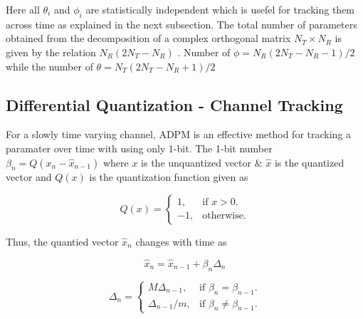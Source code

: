 \documentclass[conference]{IEEEtran}
\begin{document}
Here all $\theta_i$ and $\phi_i$ are statistically independent which is usefel for tracking them across time as explained in the next subsection. The total number of parameters obtained from the decomposition of a complex orthogonal matrix $N_{T} \times N_{R} $ is given by the relation $N_{R}(2N_{T} - N_{R}) $ \cite{4114278}. Number of $\phi = N_{R}(2N_{T} - N_{R}-1)/2$ while the number of $\theta = N_{T}(2N_{T} - N_{R}+1)/2$ 



  

\subsection{Differential Quantization - Channel Tracking} 
\label{quantiz} 

For a slowly time varying channel, ADPM is an effective method for tracking a paramater over time with using only 1-bit. The 1-bit number $\beta_{n} = Q(x_{n} - \hat{x}_{n-1})$ where $x$ is the unquantized vector $\&$ $\hat{x}$ is the quantized vector and $Q(x)$ is the quantization function given as 

  

\begin{equation}
  Q(x)=\begin{cases}
    1, & \text{if $x>0$}.\\
    -1, & \text{otherwise}.
  \end{cases}
\end{equation}

Thus, the quantied vector $\hat{x}_n$ changes with time as 

\begin{equation} 
\hat{x}_{n} = \hat{x}_{n-1} + \beta_{n}\Delta_{n} 
\end{equation} 

\begin{equation} 
\Delta_{n} = \begin{cases} 
    M \Delta_{n-1}, & \text{if $\beta_{n} = \beta_{n-1}$}.\\ 
    \Delta_{n-1}/m , & \text{if $\beta_{n} \neq \beta_{n-1}$}. 
  \end{cases} 
\end{equation} 
\end{document}
